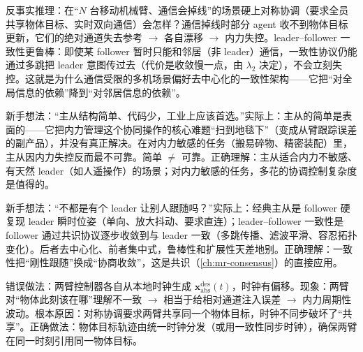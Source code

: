 \begin{insight}[通信受限场景偏好去中心化的一致性架构]
反事实推理：在“$N$ 台移动机械臂、通信会掉线”的场景硬上对称协调（要求全员共享物体目标、实时双向通信）会怎样？通信掉线时部分 agent 收不到物体目标更新，它们的绝对通道失去参考 $\to$ 各自漂移 $\to$ 内力失控。leader--follower 一致性更鲁棒：即使某 follower 暂时只能和邻居（非 leader）通信，一致性协议仍能通过多跳把 leader 意图传过去（代价是收敛慢一点，由 $\lambda_2$ 决定），不会立刻失控。这就是为什么通信受限的多机场景偏好去中心化的一致性架构——它把“对全局信息的依赖”降到“对邻居信息的依赖”。
\end{insight}

\begin{pitfall}
新手想法：“主从结构简单、代码少，工业上应该首选。”实际上：主从的简单是表面的——它把内力管理这个协同操作的核心难题“扫到地毯下”（变成从臂跟踪误差的副产品），并没有真正解决。在对内力敏感的任务（搬易碎物、精密装配）里，主从因内力失控反而最不可靠。简单 $\neq$ 可靠。正确理解：主从适合内力不敏感、有天然 leader（如人遥操作）的场景；对内力敏感的任务，多花的协调控制复杂度是值得的。
\end{pitfall}

\begin{pitfall}
新手想法：“不都是有个 leader 让别人跟随吗？”实际上：经典主从是 follower 硬复现 leader 瞬时位姿（单向、放大抖动、要求直连）；leader--follower 一致性是 follower 通过共识协议逐步收敛到与 leader 一致（多跳传播、滤波平滑、容忍拓扑变化）。后者去中心化、前者集中式，鲁棒性和扩展性天差地别。正确理解：一致性把“刚性跟随”换成“协商收敛”，这是共识（\cref{ch:mr-consensus}）的直接应用。
\end{pitfall}

\begin{pitfall}
错误做法：两臂控制器各自从本地时钟生成 $\mathbf{x}_{\text{abs}}^{\text{des}}(t)$，时钟有偏移。现象：两臂对“物体此刻该在哪”理解不一致 $\to$ 相当于给相对通道注入误差 $\to$ 内力周期性波动。根本原因：对称协调要求两臂共享同一个物体目标，时钟不同步破坏了“共享”。正确做法：物体目标轨迹由统一时钟分发（或用一致性同步时钟），确保两臂在同一时刻引用同一物体目标。
\end{pitfall}

